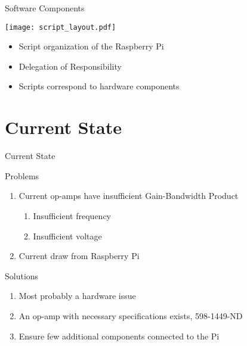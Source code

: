 \begin{frame}{Software Components}
\begin{multicols}{2}

\texttt{[image: script\_layout.pdf]}

\newpage

\begin{itemize}
  \item Script organization of the Raspberry Pi
  \item Delegation of Responsibility
  \item Scripts correspond to hardware components
\end{itemize}

\end{multicols}
\end{frame}

\section{Current State}

\begin{frame}{Current State}
  \begin{block}{Problems}
    \begin{enumerate}
      \item Current op-amps have insufficient Gain-Bandwidth Product
        \begin{enumerate}
        \item Insufficient frequency
        \item Insufficient voltage
        \end{enumerate}
      \item Current draw from Raspberry Pi
    \end{enumerate}
  \end{block}

  \begin{block}{Solutions}
    \begin{enumerate}
      \item Most probably a hardware issue
      \item An op-amp with necessary specifications exists, 598-1449-ND
      \item Ensure few additional components connected to the Pi
    \end{enumerate}
  \end{block}
\end{frame}


